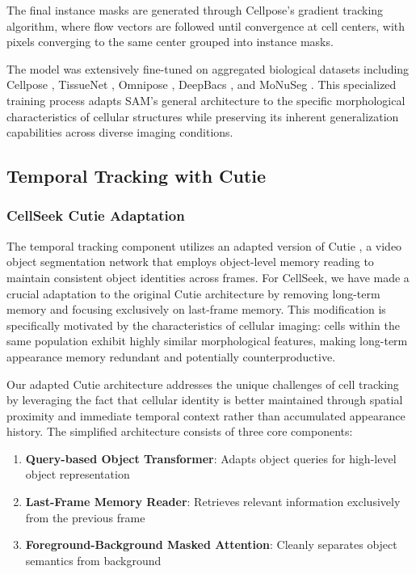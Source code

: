 \documentclass[../cellseek_paper.tex]{subfiles}
\begin{document}
The final instance masks are generated through Cellpose's gradient tracking algorithm, where flow vectors are followed until convergence at cell centers, with pixels converging to the same center grouped into instance masks.

The model was extensively fine-tuned on aggregated biological datasets including Cellpose \cite{stringer2021cellpose}, TissueNet \cite{gjorevski2022tissue}, Omnipose \cite{cutler2022omnipose}, DeepBacs \cite{spahn2022deepbacs}, and MoNuSeg \cite{kumar2017dataset}. This specialized training process adapts SAM's general architecture to the specific morphological characteristics of cellular structures while preserving its inherent generalization capabilities across diverse imaging conditions.

\subsection{Temporal Tracking with Cutie}

\subsubsection{CellSeek Cutie Adaptation}

The temporal tracking component utilizes an adapted version of Cutie \cite{cheng2024putting}, a video object segmentation network that employs object-level memory reading to maintain consistent object identities across frames. For CellSeek, we have made a crucial adaptation to the original Cutie architecture by removing long-term memory and focusing exclusively on last-frame memory. This modification is specifically motivated by the characteristics of cellular imaging: cells within the same population exhibit highly similar morphological features, making long-term appearance memory redundant and potentially counterproductive.

Our adapted Cutie architecture addresses the unique challenges of cell tracking by leveraging the fact that cellular identity is better maintained through spatial proximity and immediate temporal context rather than accumulated appearance history. The simplified architecture consists of three core components:

\begin{enumerate}
  \item \textbf{Query-based Object Transformer}: Adapts object queries for high-level object representation
  \item \textbf{Last-Frame Memory Reader}: Retrieves relevant information exclusively from the previous frame
  \item \textbf{Foreground-Background Masked Attention}: Cleanly separates object semantics from background
\end{enumerate}
\end{document}

